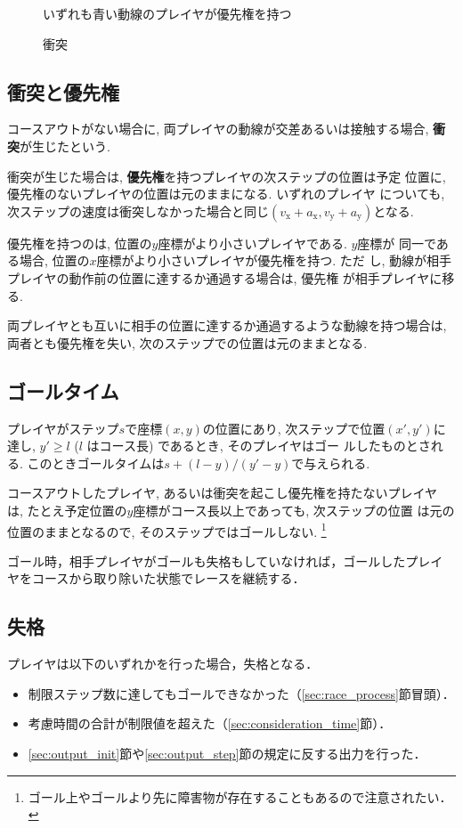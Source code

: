 \documentclass[11pt]{jarticle}
\newcommand\secref[1]{\mbox{\ref{#1}節}}
\begin{document}
\begin{figure}
  \caption{衝突}
  \label{fig:collision}
  いずれも青い動線のプレイヤが優先権を持つ
  \vspace{-1.5cm}
\end{figure}

\subsection{衝突と優先権}
コースアウトがない場合に, 両プレイヤの動線が交差あるいは接触する場合,
{\bf 衝突}が生じたという.

衝突が生じた場合は, {\bf 優先権}を持つプレイヤの次ステップの位置は予定
位置に, 優先権のないプレイヤの位置は元のままになる.  いずれのプレイヤ
についても, 次ステップの速度は衝突しなかった場合と同じ$(v_\mathrm{x}+a_\mathrm{x},
v_\mathrm{y}+a_\mathrm{y})$となる.

優先権を持つのは, 位置の$y$座標がより小さいプレイヤである.  $y$座標が
同一である場合, 位置の$x$座標がより小さいプレイヤが優先権を持つ. ただ
し, 動線が相手プレイヤの動作前の位置に達するか通過する場合は, 優先権
が相手プレイヤに移る.

両プレイヤとも互いに相手の位置に達するか通過するような動線を持つ場合は,
両者とも優先権を失い, 次のステップでの位置は元のままとなる.

\subsection{ゴールタイム}
プレイヤがステップ$s$で座標$(x, y)$の位置にあり, 次ステップで位置$(x',
y')$に達し, $y'\ge l$ ($l$ はコース長) であるとき, そのプレイヤはゴー
ルしたものとされる.  このときゴールタイムは$s + (l-y)/(y'-y)$で与えられる.

コースアウトしたプレイヤ, あるいは衝突を起こし優先権を持たないプレイヤ
は, たとえ予定位置の$y$座標がコース長以上であっても, 次ステップの位置
は元の位置のままとなるので, そのステップではゴールしない.
\footnote{ゴール上やゴールより先に障害物が存在することもあるので注意されたい．}

ゴール時，相手プレイヤがゴールも失格もしていなければ，ゴールしたプレイ
ヤをコースから取り除いた状態でレースを継続する．

\subsection{失格}\label{sec:disqualification}
プレイヤは以下のいずれかを行った場合，失格となる．
\begin{itemize}
\item 制限ステップ数に達してもゴールできなかった（\secref{sec:race_process}冒頭）．
\item 考慮時間の合計が制限値を超えた（\secref{sec:consideration_time}）．
\item \secref{sec:output_init}や\secref{sec:output_step}の規定に反する出力を行った．
\end{itemize}
\end{document}
